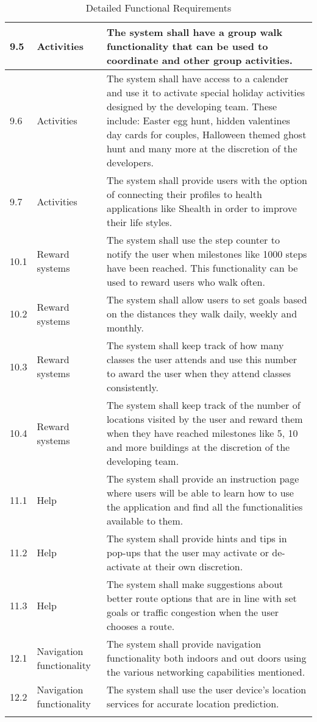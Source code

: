 \documentclass[12pt,a4paper]{report}
\begin{document}
\begin{longtable}{|p{}| p{} | p{} |}
\hline
9.5& Activities & The system shall have a group walk functionality that can be used to coordinate  and other group activities.\\ 
\hline
9.6& Activities & The system shall have access to a calender and use it to activate special holiday activities designed by the developing team. These include: Easter egg hunt, hidden valentines day cards for couples, Halloween themed ghost hunt and many more at the discretion of the developers.\\
\hline
9.7& Activities & The system shall provide users with the option of connecting their profiles to health applications like Shealth in order to improve their life styles.\\
\hline
10.1& Reward systems & The system shall use the step counter to notify the user when milestones like 1000 steps have been reached. This functionality can be used to reward users who walk often.\\
\hline
10.2& Reward systems & The system shall allow users to set goals based on the distances they walk daily, weekly and monthly. \\
\hline
10.3& Reward systems & The system shall keep track of how many classes the user attends and use this number to award the user when they attend classes consistently.\\
\hline
10.4& Reward systems& The system  shall keep track of the number of locations visited by the user and reward them when they have reached milestones like 5, 10 and more buildings at the discretion of the developing team.\\
\hline
11.1& Help &The system shall provide an instruction page where users will be able to learn how to use the application and find all the functionalities available to them.\\
\hline
11.2& Help& The system shall provide hints and tips in pop-ups that the user may activate or de-activate at their own discretion.\\
\hline
11.3& Help& The system shall make suggestions about better route options that are in line with set goals or traffic congestion when the user chooses a route.\\
\hline
12.1 &Navigation functionality & The system shall provide navigation functionality both indoors and out doors using the various networking capabilities mentioned.\\
\hline
12.2&Navigation functionality &The system shall use the user device's location services for accurate location prediction.\\
\hline


\caption{Detailed Functional Requirements} %
\label{tab:NavUP Functional Requirements}
\end{longtable}
\end{document}
